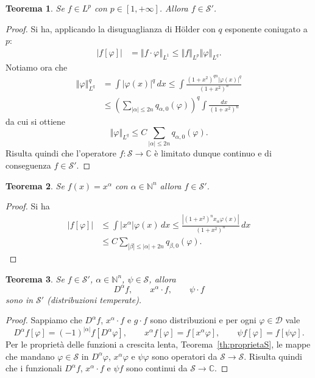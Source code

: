 \documentclass[italian,a4paper,oneside,headinclude]{scrbook}
\renewcommand{\phi}{\varphi}
\newcommand{\D}{\mathcal D}
\renewcommand{\S}{\mathcal S}
\newcommand{\CC}{\mathbb C}
\newcommand{\NN}{\mathbb N}
\newcommand{\abs}[1]{{\left|#1\right|}}
\newcommand{\Abs}[1]{{\left\Vert #1\right\Vert}}
\newtheorem{theorem}{Teorema}
\begin{document}
\begin{theorem}
  Se $f\in L^p$ con $p\in [1,+\infty]$.
  Allora $f\in\S'$.
\end{theorem}
%
\begin{proof}
  Si ha, applicando la disuguaglianza di H\"older con $q$ esponente
  coniugato a $p$:
  \begin{align*}
    \abs{f[\phi]}
    & =\Abs{f\cdot \phi}_{L^1}
    \le \Abs{f}_{L^p} \Abs{\phi}_{L^q}.
  \end{align*}
  Notiamo ora che
 \begin{align*}
 \Abs{\phi}_{L^q}^q
   & = \int \abs{\phi(x)}^q\, dx
    \le \int \frac{(1+x^2)^{qn} \abs{\phi(x)}^q}{(1+x^2)^n}\\
    &\le \left(\sum_{\abs{\alpha}\le 2n} q_{\alpha,0}(\phi)\right)^q
    \int \frac{dx}{(1+x^2)^n}
 \end{align*}
 da cui si ottiene
 \[
   \Abs{\phi}_{L^q} \le C \sum_{\abs{\alpha}\le 2n} q_{\alpha,0}(\phi).
 \]
 Risulta quindi che l'operatore $f\colon \S\to \CC$ è limitato dunque continuo
 e di conseguenza $f\in\S'$.
\end{proof}

\begin{theorem}
Se $f(x) = x^\alpha$ con $\alpha \in \NN^n$ allora $f \in \S'$.
\end{theorem}
%
\begin{proof}
Si ha
\begin{align*}
\abs{f[\phi]}
& \le \int \abs{x^\alpha} \phi(x)\, dx
\le \frac{\abs{(1+x^2)^n x_\alpha \phi(x)}}{(1+x^2)^n}\, dx\\
&\le C \sum_{\abs{\beta}\le \abs{\alpha}+2n} q_{\beta,0}(\phi).
\end{align*}
\end{proof}

\begin{theorem}
Se $f\in\S'$, $\alpha\in\NN^n$, $\psi\in \S$, allora
\[
D^\alpha f,
\qquad x^\alpha\cdot f,
\qquad \psi\cdot f
\]
sono in $\S'$ (distribuzioni temperate).
\end{theorem}
%
\begin{proof}
Sappiamo che $D^\alpha f$, $x^\alpha\cdot f$ e $g\cdot f$ sono distribuzioni e
per ogni $\phi\in\D$ vale
\[
D^\alpha f[\phi] = (-1)^{\abs{\alpha}} f[D^\alpha \phi],
\qquad x^\alpha f[\phi] = f[ x^\alpha \phi],
\qquad \psi f[\phi] = f[\psi \phi].
\]
Per le proprietà delle funzioni a crescita lenta, Teorema~\ref{th:proprietaS},
le mappe che mandano $\phi \in \S$ in $D^\alpha \phi$,
$x^\alpha \phi$ e $\psi \phi$ sono operatori
da $\S\to\S$. Risulta quindi che i funzionali $D^\alpha f$, $x^\alpha \cdot f$
e $\psi f$ sono continui da $\S\to \CC$.
\end{proof}
\end{document}
